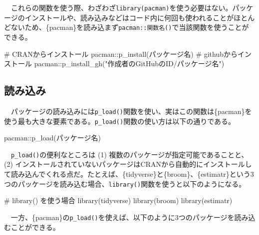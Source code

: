 \documentclass[
  a4paper,
  pandoc,
  ja=standard,
  jafont=haranoaji]{bxjsbook}
\newenvironment{Shaded}{\begin{snugshade}}{\end{snugshade}}
\newcommand{\CommentTok}[1]{\textcolor[rgb]{0.37,0.37,0.37}{#1}}
\newcommand{\FunctionTok}[1]{\textcolor[rgb]{0.28,0.35,0.67}{#1}}
\newcommand{\NormalTok}[1]{\textcolor[rgb]{0.00,0.48,0.65}{#1}}
\newcommand{\SpecialCharTok}[1]{\textcolor[rgb]{0.37,0.37,0.37}{#1}}
\newcommand{\StringTok}[1]{\textcolor[rgb]{0.13,0.47,0.30}{#1}}
\begin{document}
　これらの関数を使う際、わざわざ\texttt{library(pacman)}を使う必要はない。パッケージのインストールや、読み込みなどはコード内に何回も使われることがほとんどないため、\{pacman\}を読み込まず\texttt{pacman::関数名()}で当該関数を使うことができる。

\begin{Shaded}
\begin{Highlighting}[numbers=left,,]
\CommentTok{\# CRANからインストール}
\NormalTok{pacman}\SpecialCharTok{::}\FunctionTok{p\_install}\NormalTok{(パッケージ名)}
\CommentTok{\# githubからインストール}
\NormalTok{pacman}\SpecialCharTok{::}\FunctionTok{p\_install\_gh}\NormalTok{(}\StringTok{"作成者のGitHubのID/パッケージ名"}\NormalTok{) }
\end{Highlighting}
\end{Shaded}

\hypertarget{ux8aadux307fux8fbcux307f}{%
\subsection{読み込み}\label{ux8aadux307fux8fbcux307f}}

　パッケージの読み込みには\texttt{p\_load()}関数を使い、実はこの関数は\{pacman\}を使う最も大きな要素である。\texttt{p\_load()}関数の使い方は以下の通りである。

\begin{Shaded}
\begin{Highlighting}[numbers=left,,]
\NormalTok{pacman}\SpecialCharTok{::}\FunctionTok{p\_load}\NormalTok{(パッケージ名)}
\end{Highlighting}
\end{Shaded}

　\texttt{p\_load()}の便利なところは (1)
複数のパッケージが指定可能であることと、 (2)
インストールされていないパッケージはCRANから自動的にインストールして読み込んでくれる点だ。たとえば、\{tidyverse\}と\{broom\}、\{estimatr\}という3つのパッケージを読み込む場合、\texttt{library()}関数を使うと以下のようになる。

\begin{Shaded}
\begin{Highlighting}[numbers=left,,]
\CommentTok{\# library() を使う場合}
\FunctionTok{library}\NormalTok{(tidyverse)}
\FunctionTok{library}\NormalTok{(broom)}
\FunctionTok{library}\NormalTok{(estimatr)}
\end{Highlighting}
\end{Shaded}

　一方、\{pacman\}の\texttt{p\_load()}を使えば、以下のように3つのパッケージを読み込むことができる。
\end{document}
